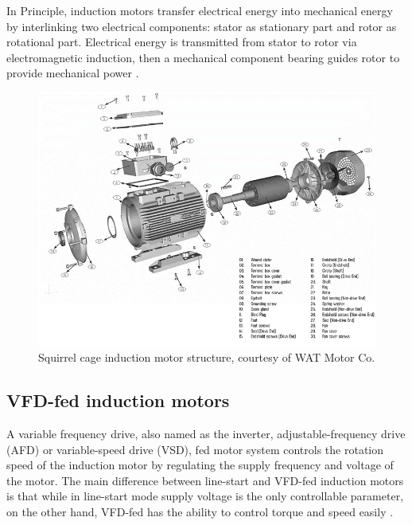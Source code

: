 In Principle, induction motors transfer electrical energy into mechanical energy by interlinking two electrical components: stator as stationary part and rotor as rotational part. Electrical energy is transmitted from stator to rotor via electromagnetic induction, then a mechanical component bearing guides rotor to provide mechanical power \cite{oliver1992electric,karmakar2016induction}.

\begin{figure}[h]
	\centering
	\includegraphics[width=350pt,keepaspectratio=true]{./fig/watmotor.PNG}
	\caption{Squirrel cage induction motor structure, courtesy of WAT Motor Co.}	
	\label{motor}
\end{figure}
\pagebreak
\subsection{VFD-fed induction motors}

A variable frequency drive, also named as the inverter, adjustable-frequency drive (AFD) or variable-speed drive (VSD), fed motor system controls the rotation speed of the induction motor by regulating the supply frequency and voltage of the motor. The main difference between line-start and VFD-fed induction motors is that while in line-start mode supply voltage is the only controllable parameter, on the other hand, VFD-fed has the ability to control torque and speed easily \cite{faiz2017fault}.


